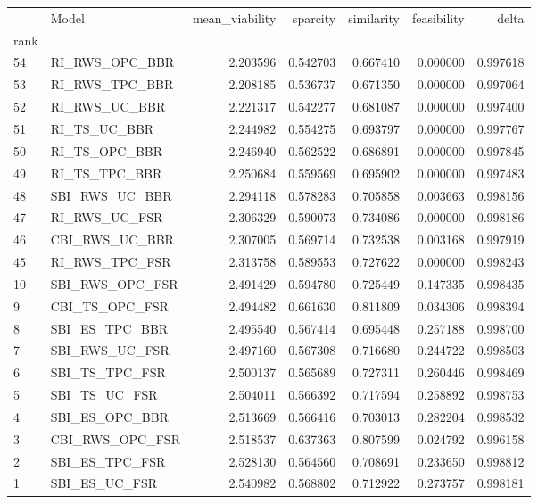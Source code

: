 \begin{tabular}{llrrrrr}
 & Model & mean_viability & sparcity & similarity & feasibility & delta \\
rank &  &  &  &  &  &  \\
54 & RI\_RWS\_OPC\_BBR & 2.203596 & 0.542703 & 0.667410 & 0.000000 & 0.997618 \\
53 & RI\_RWS\_TPC\_BBR & 2.208185 & 0.536737 & 0.671350 & 0.000000 & 0.997064 \\
52 & RI\_RWS\_UC\_BBR & 2.221317 & 0.542277 & 0.681087 & 0.000000 & 0.997400 \\
51 & RI\_TS\_UC\_BBR & 2.244982 & 0.554275 & 0.693797 & 0.000000 & 0.997767 \\
50 & RI\_TS\_OPC\_BBR & 2.246940 & 0.562522 & 0.686891 & 0.000000 & 0.997845 \\
49 & RI\_TS\_TPC\_BBR & 2.250684 & 0.559569 & 0.695902 & 0.000000 & 0.997483 \\
48 & SBI\_RWS\_UC\_BBR & 2.294118 & 0.578283 & 0.705858 & 0.003663 & 0.998156 \\
47 & RI\_RWS\_UC\_FSR & 2.306329 & 0.590073 & 0.734086 & 0.000000 & 0.998186 \\
46 & CBI\_RWS\_UC\_BBR & 2.307005 & 0.569714 & 0.732538 & 0.003168 & 0.997919 \\
45 & RI\_RWS\_TPC\_FSR & 2.313758 & 0.589553 & 0.727622 & 0.000000 & 0.998243 \\
10 & SBI\_RWS\_OPC\_FSR & 2.491429 & 0.594780 & 0.725449 & 0.147335 & 0.998435 \\
9 & CBI\_TS\_OPC\_FSR & 2.494482 & 0.661630 & 0.811809 & 0.034306 & 0.998394 \\
8 & SBI\_ES\_TPC\_BBR & 2.495540 & 0.567414 & 0.695448 & 0.257188 & 0.998700 \\
7 & SBI\_RWS\_UC\_FSR & 2.497160 & 0.567308 & 0.716680 & 0.244722 & 0.998503 \\
6 & SBI\_TS\_TPC\_FSR & 2.500137 & 0.565689 & 0.727311 & 0.260446 & 0.998469 \\
5 & SBI\_TS\_UC\_FSR & 2.504011 & 0.566392 & 0.717594 & 0.258892 & 0.998753 \\
4 & SBI\_ES\_OPC\_BBR & 2.513669 & 0.566416 & 0.703013 & 0.282204 & 0.998532 \\
3 & CBI\_RWS\_OPC\_FSR & 2.518537 & 0.637363 & 0.807599 & 0.024792 & 0.996158 \\
2 & SBI\_ES\_TPC\_FSR & 2.528130 & 0.564560 & 0.708691 & 0.233650 & 0.998812 \\
1 & SBI\_ES\_UC\_FSR & 2.540982 & 0.568802 & 0.712922 & 0.273757 & 0.998181 \\
\end{tabular}
